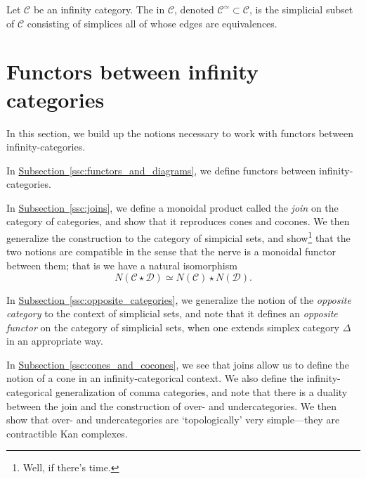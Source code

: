 \documentclass[main.tex]{subfiles}
\begin{document}
\begin{definition}
  \label{def:maximal_infinity_groupoid}
  Let $\mathcal{C}$ be an infinity category. The  in $\mathcal{C}$, denoted $\mathcal{C}^{\simeq} \subset \mathcal{C}$, is the simplicial subset of $\mathcal{C}$ consisting of simplices all of whose edges are equivalences.
\end{definition}

\section{Functors between infinity categories}
\label{sec:functors_between_infinity_categories}

In this section, we build up the notions necessary to work with functors between infinity-categories.

In \hyperref[ssc:functors_and_diagrams]{Subsection~\ref*{ssc:functors_and_diagrams}}, we define functors between infinity-categories.

In \hyperref[ssc:joins]{Subsection~\ref*{ssc:joins}}, we define a monoidal product called the \emph{join} on the category of categories, and show that it reproduces cones and cocones. We then generalize the construction to the category of simpicial sets, and show\footnote{Well, if there's time.} that the two notions are compatible in the sense that the nerve is a monoidal functor between them; that is we have a natural isomorphism
\begin{equation*}
  N(\mathcal{C} \star \mathcal{D}) \simeq N(\mathcal{C}) \star N(\mathcal{D}).
\end{equation*}

In \hyperref[ssc:opposite_categories]{Subsection~\ref*{ssc:opposite_categories}}, we generalize the notion of the \emph{opposite category} to the context of simplicial sets, and note that it defines an \emph{opposite functor} on the category of simplicial sets, when one extends simplex category $\Delta$ in an appropriate way.

In \hyperref[ssc:cones_and_cocones]{Subsection~\ref*{ssc:cones_and_cocones}}, we see that joins allow us to define the notion of a cone in an infinity-categorical context. We also define the infinity-categorical generalization of comma categories, and note that there is a duality between the join and the construction of over- and undercategories. We then show that over- and undercategories are `topologically' very simple---they are contractible Kan complexes.
\end{document}
